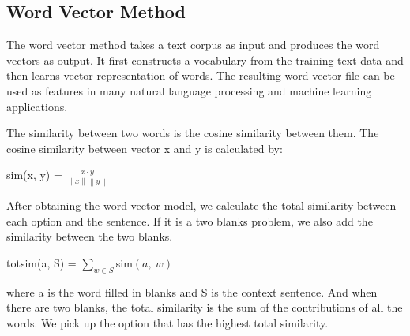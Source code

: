 \documentclass[11pt]{article}
\begin{document}

\subsection{Word Vector Method}
The word vector method  takes a text corpus as input and produces the word vectors as output. It first constructs a vocabulary from the training text data and then learns vector representation of words. The resulting word vector file can be used as features in many natural language processing and machine learning applications.  

The similarity between two words is the cosine similarity between them. The cosine similarity between vector x and y is calculated by:
\begin{center}
sim(x, y) = $\frac{x\cdot y}{\left \| x \right \|\left \| y \right \|}$
\end{center}
After obtaining the word vector model, we calculate the total similarity between each option and the sentence. If it is a two blanks problem, we also add the similarity between the two blanks.
\begin{center}
totsim(a, S) = $\sum_{w\in S} $sim$(a,\ w)$\\
\end{center}
where a is the word filled in blanks and S is the context sentence. And when there are two blanks, the total similarity is the sum of the contributions of all the words. We pick up the option that has the highest total similarity.
\end{document}
